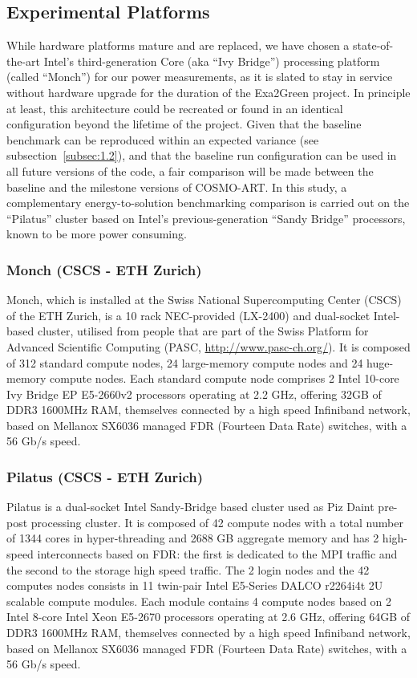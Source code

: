 \subsection{Experimental Platforms}
\label{subsec:2.1}
While hardware  platforms mature  and are replaced,  we have  chosen a
state-of-the-art  Intel's third-generation  Core (aka  ``Ivy Bridge'')
processing platform (called ``Monch'')  for our power measurements, as
it  is slated  to stay  in service  without hardware  upgrade  for the
duration  of  the Exa2Green  project.   In  principle  at least,  this
architecture could be recreated or found in an identical configuration
beyond the lifetime of the project.  Given that the baseline benchmark
can    be    reproduced    within    an   expected    variance    (see
subsection~\ref{subsec:1.2}), and that  the baseline run configuration
can be used in all future versions of the code, a fair comparison will
be made between the baseline  and the milestone versions of COSMO-ART.
In  this   study,  a  complementary   energy-to-solution  benchmarking
comparison is carried out on  the ``Pilatus'' cluster based on Intel's
previous-generation  ``Sandy  Bridge'' processors,  known  to be  more
power consuming.

\subsubsection{Monch (CSCS - ETH Zurich)}
Monch, which is installed  at the Swiss National Supercomputing Center
(CSCS)  of the ETH  Zurich, is  a 10  rack NEC-provided  (LX-2400) and
dual-socket Intel-based cluster, utilised from people that are part of
the   Swiss  Platform   for  Advanced   Scientific   Computing  (PASC,
\url{http://www.pasc-ch.org/}).   It  is   composed  of  312  standard
compute  nodes,  24  large-memory  compute nodes  and  24  huge-memory
compute nodes.   Each standard compute node comprises  2 Intel 10-core
Ivy Bridge EP E5-2660v2 processors operating at 2.2 GHz, offering 32GB
of DDR3 1600MHz  RAM, themselves connected by a  high speed Infiniband
network,  based on Mellanox  SX6036 managed  FDR (Fourteen  Data Rate)
switches, with a 56 Gb/s speed.

\subsubsection{Pilatus (CSCS - ETH Zurich)}
Pilatus is a dual-socket Intel  Sandy-Bridge based cluster used as Piz
Daint pre-post processing cluster.  It is composed of 42 compute nodes
with  a total  number of  1344 cores  in hyper-threading  and  2688 GB
aggregate memory and has 2  high-speed interconnects based on FDR: the
first is  dedicated to the MPI  traffic and the second  to the storage
high  speed traffic.  The  2 login  nodes  and the  42 computes  nodes
consists in  11 twin-pair Intel  E5-Series DALCO r2264i4t  2U scalable
compute  modules.  Each  module contains  4 compute  nodes based  on 2
Intel  8-core Intel  Xeon  E5-2670 processors  operating  at 2.6  GHz,
offering  64GB of  DDR3 1600MHz  RAM, themselves  connected by  a high
speed  Infiniband  network,  based  on  Mellanox  SX6036  managed  FDR
(Fourteen Data Rate) switches, with a 56 Gb/s speed.

